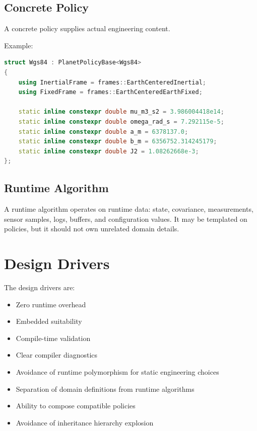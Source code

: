 \documentclass[11pt]{article}
\begin{document}
\subsection{Concrete Policy}

A concrete policy supplies actual engineering content.

Example:

\begin{lstlisting}[language=C++]
struct Wgs84 : PlanetPolicyBase<Wgs84>
{
    using InertialFrame = frames::EarthCenteredInertial;
    using FixedFrame = frames::EarthCenteredEarthFixed;

    static inline constexpr double mu_m3_s2 = 3.986004418e14;
    static inline constexpr double omega_rad_s = 7.292115e-5;
    static inline constexpr double a_m = 6378137.0;
    static inline constexpr double b_m = 6356752.314245179;
    static inline constexpr double J2 = 1.08262668e-3;
};
\end{lstlisting}

\subsection{Runtime Algorithm}

A runtime algorithm operates on runtime data: state, covariance, measurements,
sensor samples, logs, buffers, and configuration values. It may be templated on
policies, but it should not own unrelated domain details.

\section{Design Drivers}

The design drivers are:

\begin{itemize}
    \item Zero runtime overhead
    \item Embedded suitability
    \item Compile-time validation
    \item Clear compiler diagnostics
    \item Avoidance of runtime polymorphism for static engineering choices
    \item Separation of domain definitions from runtime algorithms
    \item Ability to compose compatible policies
    \item Avoidance of inheritance hierarchy explosion
\end{itemize}
\end{document}
